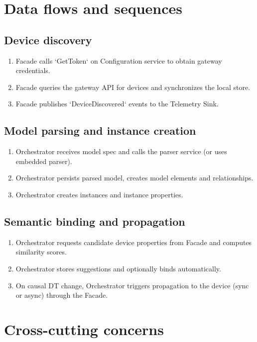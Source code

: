 \documentclass[11pt,a4paper]{article}
\begin{document}
\section{Data flows and sequences}
\subsection{Device discovery}
\begin{enumerate}
  \item Facade calls `GetToken` on Configuration service to obtain gateway credentials.
  \item Facade queries the gateway API for devices and synchronizes the local store.
  \item Facade publishes `DeviceDiscovered` events to the Telemetry Sink.
\end{enumerate}

\subsection{Model parsing and instance creation}
\begin{enumerate}
  \item Orchestrator receives model spec and calls the parser service (or uses embedded parser).
  \item Orchestrator persists parsed model, creates model elements and relationships.
  \item Orchestrator creates instances and instance properties.
\end{enumerate}

\subsection{Semantic binding and propagation}
\begin{enumerate}
  \item Orchestrator requests candidate device properties from Facade and computes similarity scores.
  \item Orchestrator stores suggestions and optionally binds automatically.
  \item On causal DT change, Orchestrator triggers propagation to the device (sync or async) through the Facade.
\end{enumerate}

\section{Cross-cutting concerns}
\end{document}
